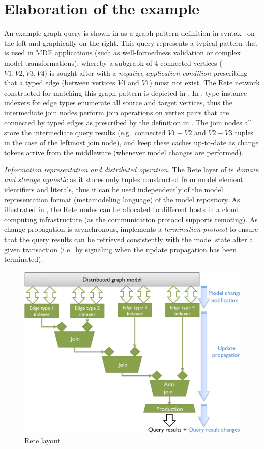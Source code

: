 \section{Elaboration of the example}
\label{sec:elaboration}

An example graph query is shown in  %
as a graph pattern definition in \eiq{} syntax~\cite{models10} on the left and graphically on the right. This query represents a typical pattern that is used in MDE applications (such as well-formedness validation or complex model transformations), whereby a subgraph of 4 connected vertices ($V1, V2, V3, V4$) is sought after with a \emph{negative application condition} prescribing that a typed edge (between vertices $V4$ and $V1$) must not exist.
The Rete network constructed for matching this graph pattern is depicted in . In \iqd{}, type-instance indexers for edge types enumerate all source and target vertices, thus the intermediate join nodes perform join operations on vertex pairs that are connected by typed edges as prescribed by the definition in . The join nodes all store the intermediate query results (e.g.\ connected $V1-V2$ and $V2-V3$ tuples in the case of the leftmost join node), and keep these caches up-to-date as change tokens arrive from the middleware (whenever model changes are performed).

\emph{Information representation and distributed operation.} The Rete layer of \iqd{} is \emph{domain and storage agnostic} as it stores only tuples constructed from model element identifiers and literals, thus it can be used independently of the model representation format (metamodeling language) of the model repository.
As illustrated in , the Rete nodes can be allocated to different hosts in a cloud computing infrastructure (as the communication protocol supports remoting). As change propagation is asynchronous, \iqd{} implements a \emph{termination protocol} to ensure that the query results can be retrieved consistently with the model state after a given transaction (i.e.\ by signaling when the update propagation has been terminated).

\begin{figure}[!tb]
\begin{center}
\includegraphics[width=.8\columnwidth]{figures/reteinternals}
\caption{Rete layout}
\label{fig:retelayout}
\end{center}
\end{figure}
